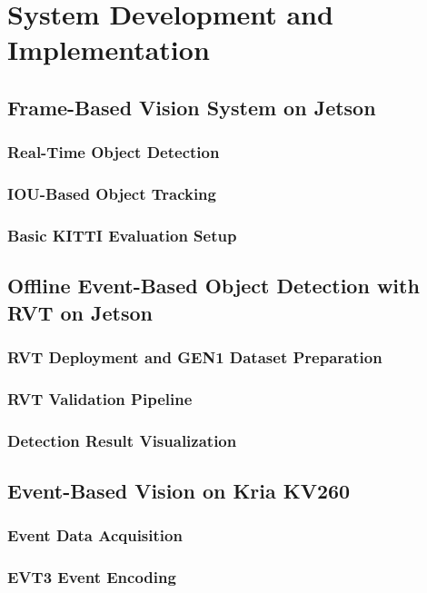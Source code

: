 \chapter{System Development and Implementation}

\section{Frame-Based Vision System on Jetson}
\subsection{Real-Time Object Detection}
\subsection{IOU-Based Object Tracking}
\subsection{Basic KITTI Evaluation Setup}

\section{Offline Event-Based Object Detection with RVT on Jetson}
\subsection{RVT Deployment and GEN1 Dataset Preparation}
\subsection{RVT Validation Pipeline}
\subsection{Detection Result Visualization}

\section{Event-Based Vision on Kria KV260}
\subsection{Event Data Acquisition}
\subsection{EVT3 Event Encoding}

